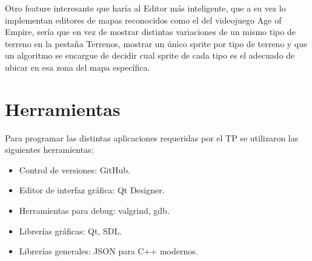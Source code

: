 \documentclass[titlepage,a4paper,12pt]{article}
\begin{document}
Otro feature interesante que haría al Editor más inteligente, que a su vez lo implementan editores de mapas reconocidos como el del videojuego Age of Empire, sería que en vez de mostrar distintas variaciones de un mismo tipo de terreno en la pestaña Terrenos, mostrar un único sprite por tipo de terreno y que un algoritmo se encargue de decidir cual sprite de cada tipo es el adecuado de ubicar en esa zona del mapa específica.  

\section{Herramientas}

Para programar las distintas aplicaciones requeridas por el TP se utilizaron las siguientes herramientas: 


\begin{itemize}

\item Control de versiones: GitHub.

\item Editor de interfaz gráfica: Qt Designer.

\item Herramientas para debug: valgrind, gdb.

\item Librerías gráficas: Qt, SDL.

\item Librerías generales: JSON para C++ modernos.

\end{itemize}
\end{document}
